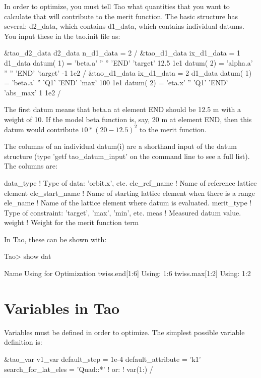 \documentclass{hitec}
\newcommand{\Section}[1]{\section{#1}\vspace*{-1ex}}
\begin{document}
In order to optimize, you must tell Tao what quantities that you want to calculate that will
contribute to the merit function. The basic structure has several: d2_data, which contains d1_data,
which contains individual datums. You input these in the tao.init file as:
\begin{code}
&tao_d2_data
    d2_data%
    n_d1_data = 2
/
&tao_d1_data
    ix_d1_data = 1
    d1_data%
    datum( 1) =  'beta.a'     '' '' 'END'   'target'  12.5   1e1  
    datum( 2) =  'alpha.a'    '' '' 'END'   'target'  -1     1e2
/ 
&tao_d1_data
    ix_d1_data = 2
    d1_data%
    datum( 1) =  'beta.a'    '' 'Q1' 'END'   'max'  100   1e1
    datum( 2) =  'eta.x'     '' 'Q1' 'END'   'abs_max'  1     1e2
/ 
\end{code}

The first datum means that beta.a at element END should be 12.5 m with a weight of 10. If the model
beta function is, say, 20 m at element END, then this datum would contribute $10*(20 - 12.5)^2$ to
the merit function.

The columns of an individual datum(i) are a shorthand input of the datum structure (type 'getf
tao_datum_input' on the command line to see a full list). The columns are:
\begin{code}
data_type       ! Type of data: 'orbit.x', etc.
ele_ref_name    ! Name of reference lattice element
ele_start_name  ! Name of starting lattice element when there is a range
ele_name        ! Name of the lattice element where datum is evaluated.
merit_type      ! Type of constraint: 'target', 'max', 'min', etc.
meas            ! Measured datum value.
weight          ! Weight for the merit function term
\end{code}

In Tao, these can be shown with:
\begin{code}
Tao> show dat

  Name                                 Using for Optimization
  twiss.end[1:6]                                 Using: 1:6
  twiss.max[1:2]                                 Using: 1:2
\end{code}


\Section{Variables in Tao}
\label{s:variables}


Variables must be defined in order to optimize. The simplest possible variable definition is: 
\begin{code}
    &tao_var
      v1_var%
      default_step = 1e-4
      default_attribute = 'k1'
      search_for_lat_eles = 'Quad::*'
      ! or: 
      ! var(1:)%
    /
\end{code}
\end{document}
